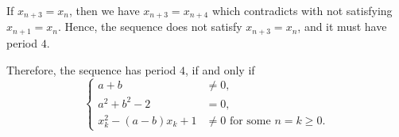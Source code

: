 \begin{enumerate}
          If \(x_{n + 3} = x_n\), then we have \(x_{n + 3} = x_{n + 4}\) which contradicts with not satisfying \(x_{n + 1} = x_n\). Hence, the sequence does not satisfy \(x_{n + 3} = x_n\), and it must have period \(4\).

          Therefore, the sequence has period \(4\), if and only if
          \[
              \left\{
              \begin{aligned}
                  a + b                  & \neq 0,                                \\
                  a^2 + b^2 - 2          & = 0,                                   \\
                  x_k^2 - (a - b)x_k + 1 & \neq 0 \text{ for some } n = k \geq 0.
              \end{aligned}
              \right.
          \]
\end{enumerate}